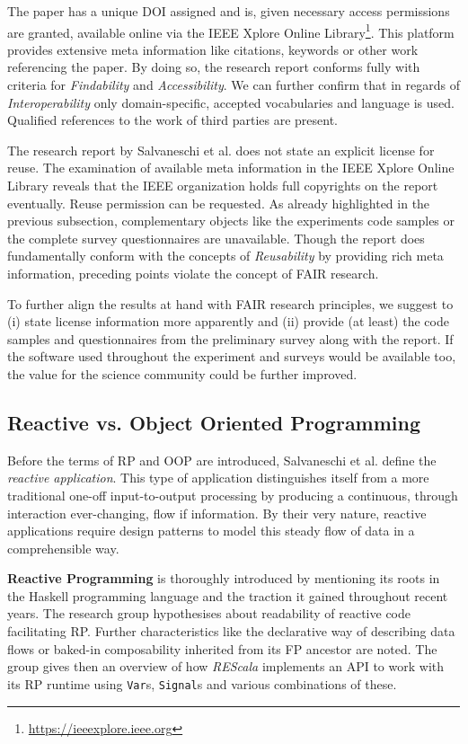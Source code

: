 \documentclass[12pt,a4paper]{article}
\begin{document}
The paper has a unique DOI assigned and is, given necessary access permissions are granted, available online via the IEEE Xplore Online Library\footnote{\url{https://ieeexplore.ieee.org}}. This platform provides extensive meta information like citations, keywords or other work referencing the paper. By doing so, the research report conforms fully with criteria for \emph{Findability} and \emph{Accessibility}. We can further confirm that in regards of \emph{Interoperability} only domain-specific, accepted vocabularies and language is used. Qualified references to the work of third parties are present.

The research report by Salvaneschi et al. does not state an explicit license for reuse. The examination of available meta information in the IEEE Xplore Online Library reveals that the IEEE organization holds full copyrights on the report eventually. Reuse permission can be requested. As already highlighted in the previous subsection, complementary objects like the experiments code samples or the complete survey questionnaires are unavailable. Though the report does fundamentally conform with the concepts of \emph{Reusability} by providing rich meta information, preceding points violate the concept of FAIR research.

To further align the results at hand with FAIR research principles, we suggest to (i) state license information more apparently and (ii) provide (at least) the code samples and questionnaires from the preliminary survey along with the report. If the software used throughout the experiment and surveys would be available too, the value for the science community could be further improved.

\subsection{Reactive vs. Object Oriented Programming}

Before the terms of RP and OOP are introduced, Salvaneschi et al. \cite{7827078} define the \emph{reactive application}. This type of application distinguishes itself from a more traditional one-off input-to-output processing by producing a continuous, through interaction ever-changing, flow if information. By their very nature, reactive applications require design patterns to model this steady flow of data in a comprehensible way.

\textbf{Reactive Programming} is thoroughly introduced by mentioning its roots in the Haskell programming language and the traction it gained throughout recent years. The research group hypothesises about readability of reactive code facilitating RP. Further characteristics like the declarative way of describing data flows or baked-in composability inherited from its FP ancestor are noted. The group gives then an overview of how \emph{REScala} implements an API to work with its RP runtime using \texttt{Var}s, \texttt{Signal}s and various combinations of these.
\end{document}
